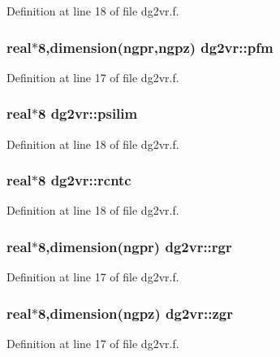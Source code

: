 Definition at line 18 of file dg2vr.f.\hypertarget{namespacedg2vr_1c53776a0c0432175658661a3696b407}{
\subsubsection[pfm]{\setlength{\rightskip}{0pt plus 5cm}real$\ast$8,dimension(ngpr,ngpz) {\bf dg2vr::pfm}}}
\label{namespacedg2vr_1c53776a0c0432175658661a3696b407}




Definition at line 17 of file dg2vr.f.\hypertarget{namespacedg2vr_1ee5b4e2b358ea098d87fd41949e2c35}{
\subsubsection[psilim]{\setlength{\rightskip}{0pt plus 5cm}real$\ast$8 {\bf dg2vr::psilim}}}
\label{namespacedg2vr_1ee5b4e2b358ea098d87fd41949e2c35}




Definition at line 18 of file dg2vr.f.\hypertarget{namespacedg2vr_aad7054333b6de374c00b4a621404770}{
\subsubsection[rcntc]{\setlength{\rightskip}{0pt plus 5cm}real$\ast$8 {\bf dg2vr::rcntc}}}
\label{namespacedg2vr_aad7054333b6de374c00b4a621404770}




Definition at line 18 of file dg2vr.f.\hypertarget{namespacedg2vr_e39029b9c09d0a13620dd230984b8d91}{
\subsubsection[rgr]{\setlength{\rightskip}{0pt plus 5cm}real$\ast$8,dimension(ngpr) {\bf dg2vr::rgr}}}
\label{namespacedg2vr_e39029b9c09d0a13620dd230984b8d91}




Definition at line 17 of file dg2vr.f.\hypertarget{namespacedg2vr_63bad1fd77a22251a8b6b79dbb51cf1f}{
\subsubsection[zgr]{\setlength{\rightskip}{0pt plus 5cm}real$\ast$8,dimension(ngpz) {\bf dg2vr::zgr}}}
\label{namespacedg2vr_63bad1fd77a22251a8b6b79dbb51cf1f}




Definition at line 17 of file dg2vr.f.
